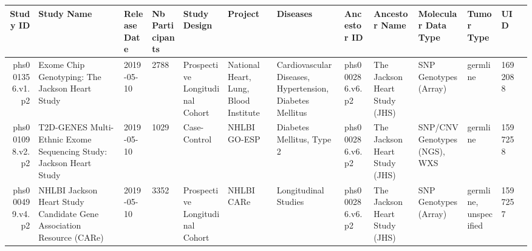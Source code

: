 \documentclass[11pt]{article}
\begin{document}
    \begin{tabular}{r|llllllllllll}
 Study ID & Study Name & Release Date & Nb Participants & Study Design & Project & Diseases & Ancestor ID & Ancestor Name & Molecular Data Type & Tumor Type & UID\\
\hline
	 phs001356.v1.p2                                          & Exome Chip Genotyping: The Jackson Heart Study           &  2019-05-10                                              & 2788                                                     & Prospective Longitudinal Cohort                          & National Heart, Lung, Blood Institute                    & Cardiovascular Diseases, Hypertension, Diabetes Mellitus & phs000286.v6.p2                                          & The Jackson Heart Study (JHS)                            & SNP Genotypes (Array)                                    & germline                                                 & 1692088                                                 \\
	 phs001098.v2.p2                                                    & T2D-GENES Multi-Ethnic Exome Sequencing Study: Jackson Heart Study &  2019-05-10                                                        & 1029                                                               & Case-Control                                                       & NHLBI GO-ESP                                                       & Diabetes Mellitus, Type 2                                          & phs000286.v6.p2                                                    & The Jackson Heart Study (JHS)                                      & SNP/CNV Genotypes (NGS), WXS                                       & germline                                                           & 1597258                                                           \\
	 phs000499.v4.p2                                                      & NHLBI Jackson Heart Study Candidate Gene Association Resource (CARe) &  2019-05-10                                                          & 3352                                                                 & Prospective Longitudinal Cohort                                      & NHLBI CARe                                                           & Longitudinal Studies                                                 & phs000286.v6.p2                                                      & The Jackson Heart Study (JHS)                                        & SNP Genotypes (Array)                                                & germline, unspecified                                                & 1597257                                                             \\

\end{tabular}
\end{document}
